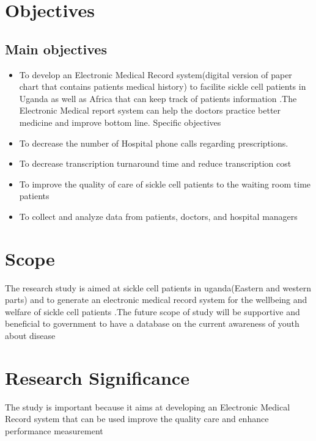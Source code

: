 \documentclass[12pt,]{article}
\begin{document}
\section{Objectives}
\subsection{Main objectives}
\begin{itemize}
\item To develop an Electronic Medical Record system(digital version of paper chart that contains patients  medical history) to facilite sickle cell patients in Uganda as well as Africa that can keep track of patients information .The Electronic Medical report system can help the doctors practice better medicine and improve bottom line.
Specific objectives
\item To decrease the number of Hospital phone calls regarding prescriptions.
\item To decrease transcription turnaround time and reduce transcription cost
\item To improve the quality of care of sickle cell patients to the  waiting room time patients
\item To collect and analyze data from patients, doctors, and hospital managers
\end{itemize}

\section{Scope}
The research study is aimed at sickle cell patients in uganda(Eastern and western parts) and to generate an electronic medical record system  for the wellbeing and welfare of sickle cell patients .The future scope of  study will be supportive and beneficial to government to have a database on the current awareness of youth about disease


\section{Research Significance}
The study is important because it aims at developing an Electronic Medical Record system that can be used improve the quality care and enhance performance measurement
\end{document}
